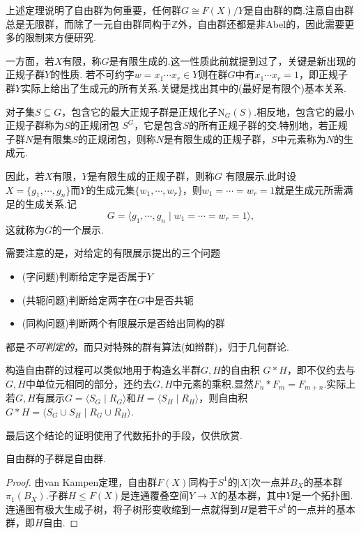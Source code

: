 上述定理说明了自由群为何重要，任何群$G\cong F(X)/Y$是自由群的商.注意自由群总是无限群，而除了一元自由群同构于$\mathbb{Z}$外，自由群还都是非Abel的，因此需要更多的限制来方便研究.

一方面，若$X$有限，称$G$是{\heiti 有限生成的}.这一性质此前就提到过了，关键是新出现的正规子群$Y$的性质.
若不可约字$w=x_1\cdots x_r\in Y$则在群$G$中有$x_1\cdots x_r=1$，即正规子群$Y$实际上给出了生成元的所有关系.关键是找出其中的(最好是有限个)基本关系.

对子集$S\subseteq G$，包含它的最大正规子群是正规化子$\mathrm{N}_G(S)$.相反地，包含它的最小正规子群称为$S$的{\heiti 正规闭包} $S^G$，它是包含$S$的所有正规子群的交.特别地，若正规子群$N$是有限集$S$的正规闭包，则称$N$是{\heiti 有限生成的正规子群}，$S$中元素称为$N$的生成元.

因此，若$X$有限，$Y$是有限生成的正规子群，则称$G$ {\heiti 有限展示}.此时设$X=\{g_1,\cdots,g_n\}$而$Y$的生成元集$\{w_1,\cdots,w_r\}$，则$w_1=\cdots=w_r=1$就是生成元所需满足的{\heiti 生成关系}.记
\[
	G=\langle g_1,\cdots,g_n\mid w_1=\cdots=w_r=1\rangle ,
\]
这就称为$G$的一个{\heiti 展示}.
\begin{remark}
	需要注意的是，对给定的有限展示提出的三个问题
	\begin{itemize}
		\item (字问题)判断给定字是否属于$Y$
		\item (共轭问题)判断给定两字在$G$中是否共轭
		\item (同构问题)判断两个有限展示是否给出同构的群
	\end{itemize}
	都是\emph{不可判定的}，而只对特殊的群有算法(如辫群)，归于几何群论.
\end{remark}
\begin{remark}
	构造自由群的过程可以类似地用于构造幺半群$G,H$的{\heiti 自由积} $G*H$，即不仅约去与$G,H$中单位元相同的部分，还约去$G,H$中元素的乘积.显然$F_n*F_m=F_{m+n}$.实际上若$G,H$有展示$G=\langle S_G\mid R_G\rangle $和$H=\langle S_H\mid R_H\rangle $，则自由积$G*H=\langle S_G\cup S_H\mid R_G\cup R_H\rangle $.
\end{remark}

最后这个结论的证明使用了代数拓扑的手段，仅供欣赏.
\begin{thm}
	自由群的子群是自由群.
\end{thm}
\begin{proof}
	由van Kampen定理，自由群$F(X)$同构于$S^1$的$|X|$次一点并$B_X$的基本群$\pi_1(B_X)$.子群$H\le F(X)$是连通覆叠空间$Y\to X$的基本群，其中$Y$是一个拓扑图.连通图有极大生成子树，将子树形变收缩到一点就得到$H$是若干$S^1$的一点并的基本群，即$H$自由.
\end{proof}

